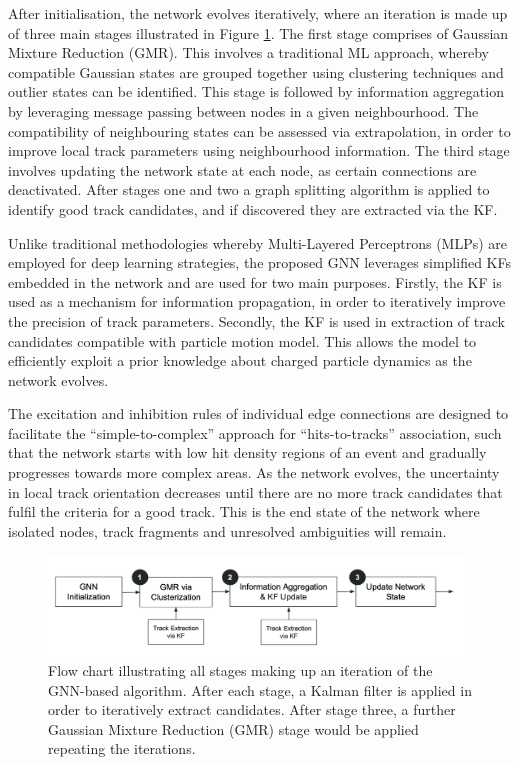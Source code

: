 After initialisation, the network evolves iteratively, where an iteration is made up of three main stages illustrated in Figure \ref{fig:flowchart}. The first stage comprises of Gaussian Mixture Reduction (GMR). This involves a traditional ML approach, whereby compatible Gaussian states are grouped together using clustering techniques and outlier states can be identified. This stage is followed by information aggregation by leveraging message passing between nodes in a given neighbourhood. The compatibility of neighbouring states can be assessed via extrapolation, in order to improve local track parameters using neighbourhood information. The third stage involves updating the network state at each node, as certain connections are deactivated. After stages one and two a graph splitting algorithm is applied to identify good track candidates, and if discovered they are extracted via the KF. 

Unlike traditional methodologies whereby Multi-Layered Perceptrons (MLPs) are employed for deep learning strategies, the proposed GNN leverages simplified KFs embedded in the network and are used for two main purposes. Firstly, the KF is used as a mechanism for information propagation, in order to iteratively improve the precision of track parameters. Secondly, the KF is used in extraction of track candidates compatible with particle motion model. This allows the model to efficiently exploit a prior knowledge about charged particle dynamics as the network evolves.

The excitation and inhibition rules of individual edge connections are designed to facilitate the “simple-to-complex” approach for “hits-to-tracks” association, such that the network starts with low hit density regions of an event and gradually progresses towards more complex areas. As the network evolves, the uncertainty in local track orientation decreases until there are no more track candidates that fulfil the criteria for a good track. This is the end state of the network where isolated nodes, track fragments and unresolved ambiguities will remain.

\begin{figure}[htbp]
    \centering
    \includegraphics[width=0.98\textwidth]{images/5-gnn-algorithm/gnn-workflow.png}
    \caption{Flow chart illustrating all stages making up an iteration of the GNN-based algorithm. After each stage, a Kalman filter is applied in order to iteratively extract candidates. After stage three, a further Gaussian Mixture Reduction (GMR) stage would be applied repeating the iterations.}
    \label{fig:flowchart}%
\end{figure}



